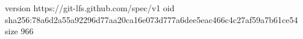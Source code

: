 version https://git-lfs.github.com/spec/v1
oid sha256:78a6d2a55a92296d77aa20ca16e073d777a6dee5eac466c4c27af59a7b61ce54
size 966

